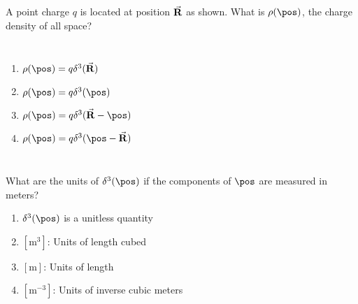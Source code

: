 \documentclass[pdf,aspectratio=169]{beamer}
\begin{document}
\begin{frame}{}
	A point charge $q$ is located at position $\va{R}$ as shown. What is $\rho(\pos)$, the charge density of all space?
	\begin{columns}
		\begin{enumerate}
			\item $\rho(\pos) = q\delta^3(\va{R})$
			\item $\rho(\pos) = q\delta^3(\pos)$
			\item \alert<2>{$\rho(\pos) = q\delta^3(\va{R}-\pos)$}
			\item \alert<2>{$\rho(\pos) = q\delta^3(\pos -\va{R})$}
		\end{enumerate}
		
		\begin{center}
		\end{center}
	\end{columns}
\end{frame}

\begin{frame}{}
	What are the units of $\delta^3(\pos)$ if the components of $\pos$ are measured in meters?
	\begin{enumerate}
		\item $\delta^3(\pos)$ is a unitless quantity
		\item $[\si{\meter^3}]$: Units of length cubed
		\item $[\si{\meter}]$: Units of length
		\item \alert<2>{$[\si{\meter^{-3}}]$: Units of inverse cubic meters}
	\end{enumerate}
\end{frame}

	
\end{document}
